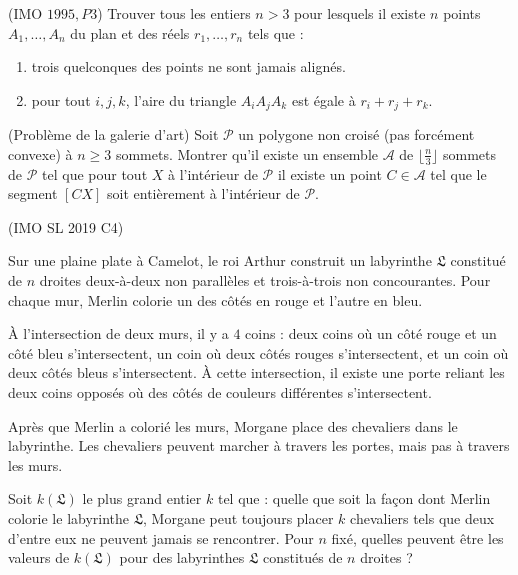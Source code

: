 \begin{exo}
(IMO $1995,P3$) Trouver tous les entiers $n > 3$ pour lesquels il existe $n$ points $A_1, \dots, A_n$
du plan et des réels $r_1, \dots, r_n$ tels que :
\begin{enumerate}
    \item trois quelconques des points ne sont jamais alignés.
    \item pour tout ${i, j, k}$, l’aire du triangle $A_iA_jA_k$ est égale à $r_i + r_j + r_k$.
\end{enumerate}
\end{exo}


\begin{exo}
(Problème de la galerie d’art) Soit $\mathcal{P}$ un polygone non croisé (pas forcément convexe) à $n\ge 3$ sommets. Montrer qu’il existe un ensemble $\mathcal{A}$ de $\lfloor\frac n3\rfloor$ sommets de $\mathcal{P}$ tel que pour tout $X$ à l’intérieur de $\mathcal{P}$ il existe un point $C\in\mathcal{A}$ tel que le segment $[CX]$ soit entièrement à l’intérieur de $\mathcal{P}$.
\end{exo}


\begin{exo}
(IMO SL 2019 C4)

Sur une plaine plate à Camelot, le roi Arthur construit un labyrinthe $\mathfrak{L}$ constitué de $n$ droites deux-à-deux non parallèles et trois-à-trois non concourantes. Pour chaque mur, Merlin colorie un des côtés en rouge et l'autre en bleu.

À l'intersection de deux murs, il y a $4$ coins : deux coins où un côté rouge et un côté bleu s'intersectent, un coin où deux côtés rouges s'intersectent, et un coin où deux côtés bleus s'intersectent. À cette intersection, il existe une porte reliant les deux coins opposés où des côtés de couleurs différentes s'intersectent.

Après que Merlin a colorié les murs, Morgane place des chevaliers dans le labyrinthe. Les chevaliers peuvent marcher à travers les portes, mais pas à travers les murs.

Soit $k(\mathfrak{L})$ le plus grand entier $k$ tel que : quelle que soit la façon dont Merlin colorie le labyrinthe $\mathfrak{L}$, Morgane peut toujours placer $k$ chevaliers tels que deux d'entre eux ne peuvent jamais se rencontrer. Pour $n$ fixé, quelles peuvent être les valeurs de $k(\mathfrak{L})$ pour des labyrinthes $\mathfrak{L}$ constitués de $n$ droites ?
\end{exo}


